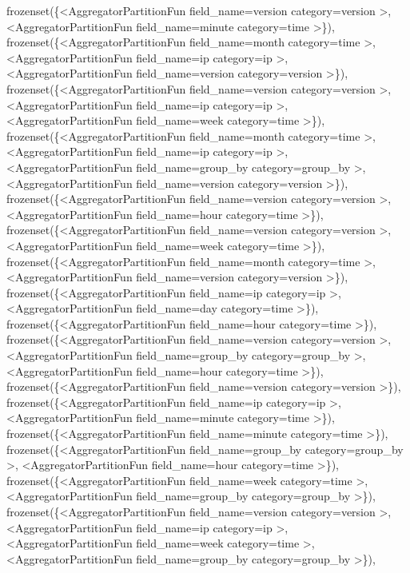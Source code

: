\documentclass[letterpaper,10pt,english]{sphinxmanual}
\begin{document}
\begin{fulllineitems}
\begin{fulllineitems}
frozenset(\{\textless{}AggregatorPartitionFun field\_name=version category=version \textgreater{}, \textless{}AggregatorPartitionFun field\_name=minute category=time \textgreater{}\}), frozenset(\{\textless{}AggregatorPartitionFun field\_name=month category=time \textgreater{}, \textless{}AggregatorPartitionFun field\_name=ip category=ip \textgreater{}, \textless{}AggregatorPartitionFun field\_name=version category=version \textgreater{}\}), frozenset(\{\textless{}AggregatorPartitionFun field\_name=version category=version \textgreater{}, \textless{}AggregatorPartitionFun field\_name=ip category=ip \textgreater{}, \textless{}AggregatorPartitionFun field\_name=week category=time \textgreater{}\}), frozenset(\{\textless{}AggregatorPartitionFun field\_name=month category=time \textgreater{}, \textless{}AggregatorPartitionFun field\_name=ip category=ip \textgreater{}, \textless{}AggregatorPartitionFun field\_name=group\_by category=group\_by \textgreater{}, \textless{}AggregatorPartitionFun field\_name=version category=version \textgreater{}\}), frozenset(\{\textless{}AggregatorPartitionFun field\_name=version category=version \textgreater{}, \textless{}AggregatorPartitionFun field\_name=hour category=time \textgreater{}\}), frozenset(\{\textless{}AggregatorPartitionFun field\_name=version category=version \textgreater{}, \textless{}AggregatorPartitionFun field\_name=week category=time \textgreater{}\}), frozenset(\{\textless{}AggregatorPartitionFun field\_name=month category=time \textgreater{}, \textless{}AggregatorPartitionFun field\_name=version category=version \textgreater{}\}), frozenset(\{\textless{}AggregatorPartitionFun field\_name=ip category=ip \textgreater{}, \textless{}AggregatorPartitionFun field\_name=day category=time \textgreater{}\}), frozenset(\{\textless{}AggregatorPartitionFun field\_name=hour category=time \textgreater{}\}), frozenset(\{\textless{}AggregatorPartitionFun field\_name=version category=version \textgreater{}, \textless{}AggregatorPartitionFun field\_name=group\_by category=group\_by \textgreater{}, \textless{}AggregatorPartitionFun field\_name=hour category=time \textgreater{}\}), frozenset(\{\textless{}AggregatorPartitionFun field\_name=version category=version \textgreater{}\}), frozenset(\{\textless{}AggregatorPartitionFun field\_name=ip category=ip \textgreater{}, \textless{}AggregatorPartitionFun field\_name=minute category=time \textgreater{}\}), frozenset(\{\textless{}AggregatorPartitionFun field\_name=minute category=time \textgreater{}\}), frozenset(\{\textless{}AggregatorPartitionFun field\_name=group\_by category=group\_by \textgreater{}, \textless{}AggregatorPartitionFun field\_name=hour category=time \textgreater{}\}), frozenset(\{\textless{}AggregatorPartitionFun field\_name=week category=time \textgreater{}, \textless{}AggregatorPartitionFun field\_name=group\_by category=group\_by \textgreater{}\}), frozenset(\{\textless{}AggregatorPartitionFun field\_name=version category=version \textgreater{}, \textless{}AggregatorPartitionFun field\_name=ip category=ip \textgreater{}, \textless{}AggregatorPartitionFun field\_name=week category=time \textgreater{}, \textless{}AggregatorPartitionFun field\_name=group\_by category=group\_by \textgreater{}\}), 
\end{fulllineitems}
\end{fulllineitems}
\end{document}
